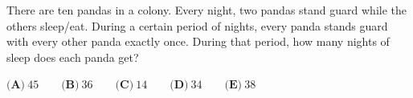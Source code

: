 There are ten pandas in a colony. Every night, two pandas stand guard while the others sleep/eat. During a certain period of nights, every panda stands guard with every other panda exactly once. During that period, how many nights of sleep does each panda get?

$\textbf{(A)}~45\qquad\textbf{(B)}~36\qquad\textbf{(C)}~14\qquad\textbf{(D)}~34\qquad\textbf{(E)}~38\qquad$
